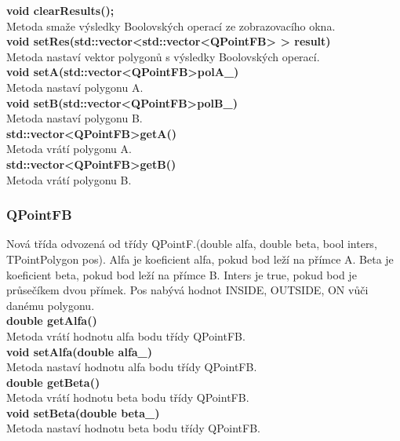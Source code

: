 \documentclass[a4paper, 12pt]{article}
\begin{document}
\textbf{void clearResults();}\\
Metoda smaže výsledky Boolovských operací ze zobrazovacího okna.\\

\textbf{void setRes(std::vector\textless std::vector\textless QPointFB> > result)}\\
Metoda nastaví vektor polygonů s výsledky Boolovských operací.\\

\textbf{void setA(std::vector\textless QPointFB\textgreater polA\_)}\\
Metoda nastaví polygonu A.\\

\textbf{void setB(std::vector\textless QPointFB\textgreater polB\_)}\\
Metoda nastaví polygonu B.\\

\textbf{std::vector\textless QPointFB\textgreater getA()}\\
Metoda vrátí polygonu A.\\

\textbf{std::vector\textless QPointFB\textgreater getB()}\\
Metoda vrátí polygonu B.\\


\subsubsection{QPointFB}
Nová třída odvozená od třídy QPointF.(double alfa, double beta, bool inters, TPointPolygon pos). Alfa je koeficient alfa, pokud bod leží na přímce A. 
Beta je koeficient beta, pokud bod leží na přímce B. Inters je true, pokud bod je průsečíkem dvou přímek. Pos nabývá hodnot INSIDE, OUTSIDE, ON vůči danému polygonu.\\

\textbf{double getAlfa()}\\
Metoda vrátí hodnotu alfa bodu třídy QPointFB.\\

\textbf{void setAlfa(double alfa\_)}\\
Metoda nastaví hodnotu alfa bodu třídy QPointFB.\\

\textbf{double getBeta()}\\
Metoda vrátí hodnotu beta bodu třídy QPointFB.\\

\textbf{void setBeta(double beta\_)}\\
Metoda nastaví hodnotu beta bodu třídy QPointFB.\\
\end{document}
